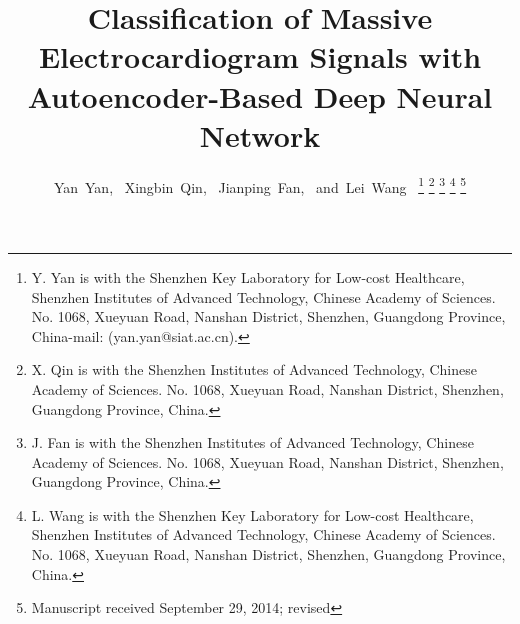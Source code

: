 \documentclass[journal]{IEEEtran}
\begin{document}
%
\title{Classification of Massive Electrocardiogram Signals with Autoencoder-Based Deep Neural Network}
%
%
%

\author{Yan~Yan,~
        Xingbin~Qin,~
        Jianping~Fan,~
        and~Lei~Wang~%
\thanks{Y. Yan is with the Shenzhen Key Laboratory for Low-cost Healthcare, Shenzhen Institutes of Advanced Technology, Chinese Academy of Sciences. No. 1068, Xueyuan Road, Nanshan District,
Shenzhen, Guangdong Province, China-mail: (yan.yan@siat.ac.cn).}%
\thanks{X. Qin is with the Shenzhen Institutes of Advanced Technology, Chinese Academy of Sciences.
No. 1068, Xueyuan Road, Nanshan District, Shenzhen, Guangdong Province, China.}%
\thanks{J. Fan is with the Shenzhen Institutes of Advanced Technology, Chinese Academy of Sciences. No. 1068, Xueyuan Road, Nanshan District, Shenzhen, Guangdong Province, China.}%
\thanks{L. Wang is with the Shenzhen Key Laboratory for Low-cost Healthcare, Shenzhen Institutes of Advanced Technology, Chinese Academy of Sciences.
No. 1068, Xueyuan Road, Nanshan District,
Shenzhen, Guangdong Province, China.}%
\thanks{Manuscript received September 29, 2014; revised}}

% 
%
\end{document}
